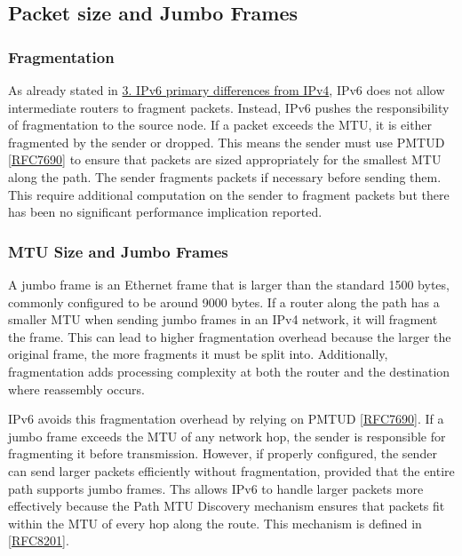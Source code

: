 \documentclass[
]{article}
\begin{document}
\pagebreak

\subsection{Packet size and Jumbo
Frames}\label{packet-size-and-jumbo-frames}

\subsubsection{Fragmentation}\label{fragmentation}

As already stated in \hyperref[ipv6-primary-differences-from-ipv4]{3.
IPv6 primary differences from IPv4}, IPv6 does not allow intermediate
routers to fragment packets. Instead, IPv6 pushes the responsibility of
fragmentation to the source node. If a packet exceeds the MTU, it is
either fragmented by the sender or dropped. This means the sender must
use PMTUD {[}\href{https://www.rfc-editor.org/info/rfc7690}{RFC7690}{]}
to ensure that packets are sized appropriately for the smallest MTU
along the path. The sender fragments packets if necessary before sending
them. This require additional computation on the sender to fragment
packets but there has been no significant performance implication
reported.

\subsubsection{MTU Size and Jumbo
Frames}\label{mtu-size-and-jumbo-frames}

A jumbo frame is an Ethernet frame that is larger than the standard 1500
bytes, commonly configured to be around 9000 bytes. If a router along
the path has a smaller MTU when sending jumbo frames in an IPv4 network,
it will fragment the frame. This can lead to higher fragmentation
overhead because the larger the original frame, the more fragments it
must be split into. Additionally, fragmentation adds processing
complexity at both the router and the destination where reassembly
occurs.

IPv6 avoids this fragmentation overhead by relying on PMTUD
{[}\href{https://www.rfc-editor.org/info/rfc7690}{RFC7690}{]}. If a
jumbo frame exceeds the MTU of any network hop, the sender is
responsible for fragmenting it before transmission. However, if properly
configured, the sender can send larger packets efficiently without
fragmentation, provided that the entire path supports jumbo frames. Ths
allows IPv6 to handle larger packets more effectively because the Path
MTU Discovery mechanism ensures that packets fit within the MTU of every
hop along the route. This mechanism is defined in
{[}\href{https://www.rfc-editor.org/info/rfc8201}{RFC8201}{]}.
\end{document}
